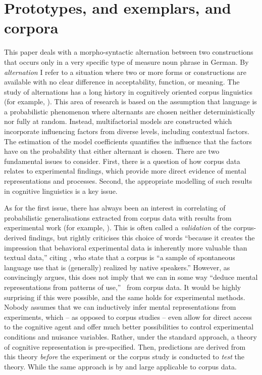 \section{Prototypes, and exemplars, and corpora}
\label{sec:cogocl}

This paper deals with a morpho-syntactic alternation between two constructions that occurs only in a very specific type of measure noun phrase in German.
By \textit{alternation} I refer to a situation where two or more forms or constructions are available with no clear difference in acceptability, function, or meaning.
The study of alternations has a long history in cognitively oriented corpus linguistics (for example, \citealp{BresnanEa2007,BresnanHay2010,BresnanFord2010,DivjakArppe2013,Gries2015,NessetJanda2010}).
This area of research is based on the assumption that language is a probabilistic phenomenon \citep{Bresnan2007} where alternants are chosen neither deterministically nor fully at random.
Instead, multifactorial models are constructed which incorporate influencing factors from diverse levels, including contextual factors.
The estimation of the model coefficients quantifies the influence that the factors have on the probability that either alternant is chosen.
There are two fundamental issues to consider.
First, there is a question of how corpus data relates to experimental findings, which provide more direct evidence of mental representations and processes.
Second, the appropriate modelling of such results in cognitive linguistics is a key issue.

As for the first issue, there has always been an interest in correlating of probabilistic generalisations extracted from corpus data with results from experimental work (for example, \citealp{ArppeJaervikivi2007,BresnanEa2007,BresnanFord2010,DivjakGries2008,DivjakEa2016,FordBresnan2013}).
This is often called a \textit{validation} of the corpus-derived findings, but \citet[303]{Divjak2016a} rightly criticises this choice of words ``because it creates the impression that behavioral experimental data is inherently more valuable than textual data,'' citing \cite{TummersEa2005}, who state that a corpus is ``a sample of spontaneous language use that is (generally) realized by native speakers.''
However, as \citet[486--487]{Dabrowska2016} convincingly argues, this does not imply that we can in some way ``deduce mental representations from patterns of use,'' \ie\ from corpus data.
It would be highly surprising if this were possible, and the same holds for experimental methods.
Nobody assumes that we can inductively infer mental representations from experiments, which -- as opposed to corpus studies -- even allow for direct access to the cognitive agent and offer much better possibilities to control experimental conditions and nuisance variables.
Rather, under the standard approach, a theory of cognitive representation is pre-specified.
Then, predictions are derived from this theory \textit{before} the experiment or the corpus study is conducted to \textit{test} the theory.
While the same approach is by and large applicable to corpus data.


